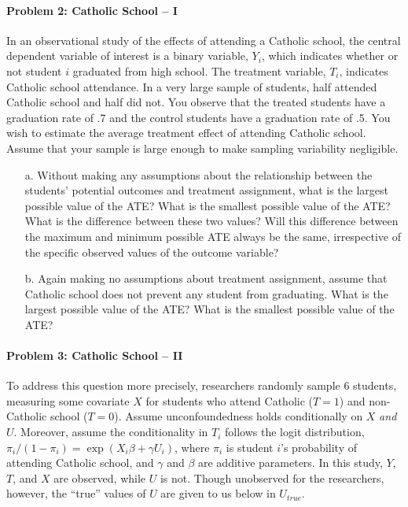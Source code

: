 \documentclass{article}
\begin{document}



\paragraph{Problem 2: Catholic School -- I}  In an observational study of the effects of
attending a Catholic school, the central dependent variable of
interest is a binary variable, $Y_i$, which indicates whether or not
student $i$ graduated from high school. The treatment variable, $T_i$,
indicates Catholic school attendance. In a very large sample of
students, half attended Catholic school and half did not. You observe
that the treated students have a graduation rate of .7 and the control
students have a graduation rate of .5. You wish to estimate the
average treatment effect of attending Catholic school. Assume that
your sample is large enough to make sampling variability negligible.

\begin{itemize}
\item[a.] Without making any assumptions about the relationship
  between the students’ potential outcomes and treatment assignment,
  what is the largest possible value of the ATE? What is the smallest
  possible value of the ATE? What is the difference between these two
  values? Will this difference between the maximum and minimum
  possible ATE always be the same, irrespective of the specific
  observed values of the outcome variable?
\item[b.] Again making no assumptions about treatment assignment,
  assume that Catholic school does not prevent any student from
  graduating. What is the largest possible value of the ATE? What is
  the smallest possible value of the ATE?
\end{itemize}

\paragraph{Problem 3: Catholic School -- II}

To address this question more precisely, researchers randomly sample 6
students, measuring some covariate $X$ for students who attend
Catholic ($T=1$) and non-Catholic school ($T=0$).  Assume
unconfoundedness holds conditionally on $X$ {\em and} $U$.
Moreover, assume the conditionality in $T_i$ follows the logit
distribution, $\pi_i/(1-\pi_i) = \exp(X_i\beta+\gamma U_i)$, where
$\pi_i$ is student $i$'s probability of attending Catholic school, and
$\gamma$ and $\beta$ are additive parameters.  
In this study, $Y$, $T$, and $X$ are observed, while $U$ is not.
Though unobserved for the researchers, however, the ``true'' values of
$U$ are given to us below in $U_{true}$.
\end{document}
